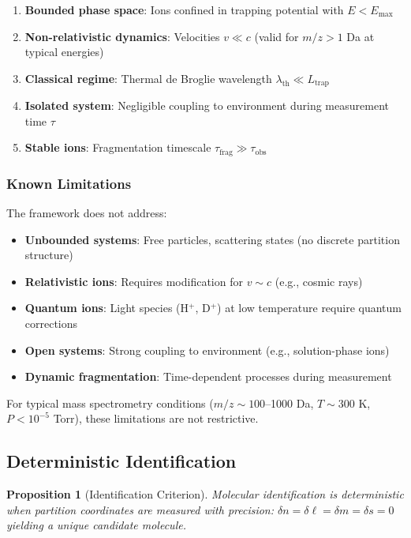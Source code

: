 \documentclass[twocolumn,10pt]{article}
\newtheorem{proposition}[theorem]{Proposition}
\begin{document}
\begin{enumerate}
    \item \textbf{Bounded phase space}: Ions confined in trapping potential with $E < E_{\max}$
    \item \textbf{Non-relativistic dynamics}: Velocities $v \ll c$ (valid for $m/z > 1$ Da at typical energies)
    \item \textbf{Classical regime}: Thermal de Broglie wavelength $\lambda_{\mathrm{th}} \ll L_{\mathrm{trap}}$
    \item \textbf{Isolated system}: Negligible coupling to environment during measurement time $\tau$
    \item \textbf{Stable ions}: Fragmentation timescale $\tau_{\mathrm{frag}} \gg \tau_{\mathrm{obs}}$
\end{enumerate}

\subsubsection{Known Limitations}

The framework does not address:

\begin{itemize}
    \item \textbf{Unbounded systems}: Free particles, scattering states (no discrete partition structure)
    \item \textbf{Relativistic ions}: Requires modification for $v \sim c$ (e.g., cosmic rays)
    \item \textbf{Quantum ions}: Light species (H$^+$, D$^+$) at low temperature require quantum corrections
    \item \textbf{Open systems}: Strong coupling to environment (e.g., solution-phase ions)
    \item \textbf{Dynamic fragmentation}: Time-dependent processes during measurement
\end{itemize}

For typical mass spectrometry conditions ($m/z \sim 100$–1000 Da, $T \sim 300$ K, $P < 10^{-5}$ Torr), these limitations are not restrictive.

\subsection{Deterministic Identification}

\begin{proposition}[Identification Criterion]
\label{prop:identification}
Molecular identification is deterministic when partition coordinates are measured with precision:
$
\delta n = \delta \ell = \delta m = \delta s = 0
$
yielding a unique candidate molecule.
\end{proposition}
\end{document}
